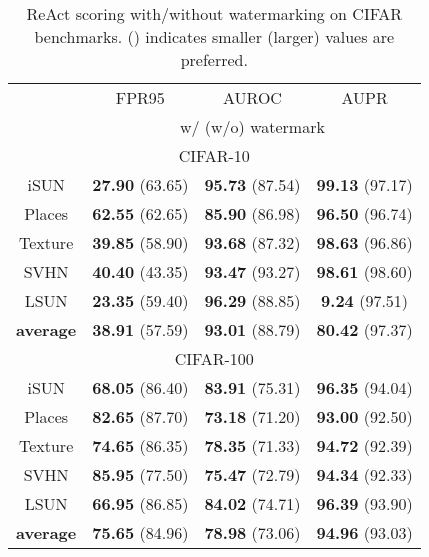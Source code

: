 \documentclass{article}
\begin{document}
\begin{table}[t]
\parbox{.47\linewidth}{
\centering
\caption{ReAct scoring with/without watermarking on CIFAR benchmarks.  () indicates smaller (larger) values are preferred.} \label{tab: react}
\vspace{5pt}
\scriptsize
{
\begin{tabular}{c|ccc}
\toprule[1.5pt]
                   & FPR95      & AUROC        & AUPR       \\
                   \cline{2-4} 
\multirow{-2}{*}{} & \multicolumn{3}{c}{w/ (w/o) watermark} \\
\midrule[0.6pt]
\multicolumn{4}{c}{\cellcolor{greyL}CIFAR-10} \\
\midrule[0.6pt]
iSUN               & \textbf{27.90} (63.65) & \textbf{95.73} (87.54) & \textbf{99.13} (97.17) \\ 
Places        & \textbf{62.55} (62.65) & \textbf{85.90} (86.98) & \textbf{96.50} (96.74) \\ 
Texture            & \textbf{39.85} (58.90) & \textbf{93.68} (87.32) & \textbf{98.63} (96.86) \\ 
SVHN               & \textbf{40.40} (43.35) & \textbf{93.47} (93.27) & \textbf{98.61} (98.60) \\ 
LSUN             & \textbf{23.35} (59.40) & \textbf{96.29} (88.85) & \textbf{9.24} (97.51) \\ 
\midrule
\textbf{average}   & \textbf{38.91} (57.59) & \textbf{93.01} (88.79) & \textbf{80.42} (97.37) \\  \midrule[1pt]
\multicolumn{4}{c}{\cellcolor{greyL}CIFAR-100} \\
\midrule[1pt]
iSUN               & \textbf{68.05} (86.40) & \textbf{83.91} (75.31) & \textbf{96.35} (94.04) \\ 
Places        & \textbf{82.65} (87.70) & \textbf{73.18} (71.20) & \textbf{93.00} (92.50) \\ 
Texture            & \textbf{74.65} (86.35) & \textbf{78.35} (71.33) & \textbf{94.72} (92.39) \\ 
SVHN               & \textbf{85.95} (77.50) & \textbf{75.47} (72.79) & \textbf{94.34} (92.33) \\ 
LSUN               & \textbf{66.95} (86.85) & \textbf{84.02} (74.71) & \textbf{96.39} (93.90) \\ 
\midrule
\textbf{average}   & \textbf{75.65} (84.96) & \textbf{78.98} (73.06) & \textbf{94.96} (93.03) \\  \bottomrule[1.5pt]      
\end{tabular}
}}~~~~

\end{table}
\end{document}
